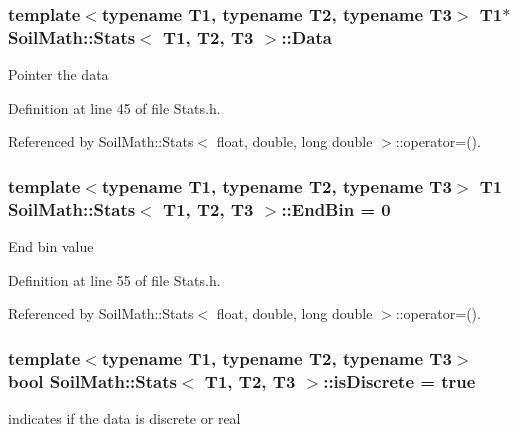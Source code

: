 \hypertarget{class_soil_math_1_1_stats_affce366ceab8419a3f732e3c3a358f65}{}
\subsubsection[{Data}]{\setlength{\rightskip}{0pt plus 5cm}template$<$typename T1, typename T2, typename T3$>$ T1$\ast$ {\bf Soil\+Math\+::\+Stats}$<$ T1, T2, T3 $>$\+::Data}\label{class_soil_math_1_1_stats_affce366ceab8419a3f732e3c3a358f65}
Pointer the data 

Definition at line 45 of file Stats.\+h.



Referenced by Soil\+Math\+::\+Stats$<$ float, double, long double $>$\+::operator=().

\hypertarget{class_soil_math_1_1_stats_a0db07157ff238d0d40c4e1f4d67afd46}{}
\subsubsection[{End\+Bin}]{\setlength{\rightskip}{0pt plus 5cm}template$<$typename T1, typename T2, typename T3$>$ T1 {\bf Soil\+Math\+::\+Stats}$<$ T1, T2, T3 $>$\+::End\+Bin = 0}\label{class_soil_math_1_1_stats_a0db07157ff238d0d40c4e1f4d67afd46}
End bin value 

Definition at line 55 of file Stats.\+h.



Referenced by Soil\+Math\+::\+Stats$<$ float, double, long double $>$\+::operator=().

\hypertarget{class_soil_math_1_1_stats_a2f54bbc8d815345b23ebbd4ba2b302bf}{}
\subsubsection[{is\+Discrete}]{\setlength{\rightskip}{0pt plus 5cm}template$<$typename T1, typename T2, typename T3$>$ bool {\bf Soil\+Math\+::\+Stats}$<$ T1, T2, T3 $>$\+::is\+Discrete = true}\label{class_soil_math_1_1_stats_a2f54bbc8d815345b23ebbd4ba2b302bf}
indicates if the data is discrete or real 

